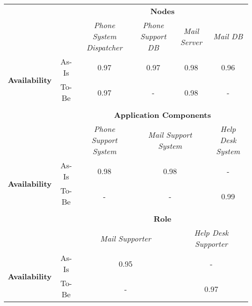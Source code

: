 \begin{table}[H]
	\centering
	\begin{tabular}{|c|c|p{2cm}|p{2.5cm}|p{2.5cm}|p{2.5cm}|}
		\cline{3-6}

		\multicolumn{2}{c}{} & \multicolumn{4}{|c|}{\textbf{Nodes}} \\ \cline{3-6}
		\multicolumn{2}{c|}{} & \multicolumn{1}{c|}{\textsl{Phone System Dispatcher}} & \multicolumn{1}{c|}{\textsl{Phone Support DB}} & \multicolumn{1}{c|}{\textsl{Mail Server}} & \multicolumn{1}{c|}{\textsl{Mail DB}}\\
		\hline
		\multirow{2}{*}{\textbf{Availability}} & As-Is & \multicolumn{1}{c|}{0.97} & \multicolumn{1}{c|}{0.97} & \multicolumn{1}{c|}{0.98} &  \multicolumn{1}{c|}{0.96}\\ \cline{2-6}
										& To-Be &\multicolumn{1}{c|}{0.97} & \multicolumn{1}{c|}{-}& \multicolumn{1}{c|}{0.98} & \multicolumn{1}{c|}{-}\\ \hline

		\multicolumn{6}{c}{} \\ \cline{3-6}							
		\multicolumn{2}{c}{} & \multicolumn{4}{|c|}{\textbf{Application Components}} \\ \cline{3-6}
		\multicolumn{2}{c|}{} & \multicolumn{1}{c|}{\textsl{Phone Support System}} & \multicolumn{2}{c|}{\textsl{Mail Support System}} & \multicolumn{1}{c|}{\textsl{Help Desk System}}\\
		\hline
		\multirow{2}{*}{\textbf{Availability}} & As-Is & \multicolumn{1}{c|}{0.98} & \multicolumn{2}{c|}{0.98} & \multicolumn{1}{c|}{-}\\ \cline{2-6}
										& To-Be &\multicolumn{1}{c|}{-} & \multicolumn{2}{c|}{-} & \multicolumn{1}{c|}{0.99}\\ \hline

	   \multicolumn{6}{c}{} \\ \cline{3-6}
		\multicolumn{2}{c}{} & \multicolumn{4}{|c|}{\textbf{Role}} \\ \cline{3-6}
		\multicolumn{2}{c|}{} & \multicolumn{2}{|c|}{\textsl{Mail Supporter}} & \multicolumn{2}{|c|}{\textsl{Help Desk Supporter}}\\ \hline
		\multirow{2}{*}{\textbf{Availability}} & As-Is & \multicolumn{2}{|c|}{0.95}& \multicolumn{2}{|c|}{-}\\ \cline{2-6}
									   & To-Be & \multicolumn{2}{|c|}{-} & \multicolumn{2}{|c|}{0.97}\\ \hline


\end{tabular}
\end{table}
